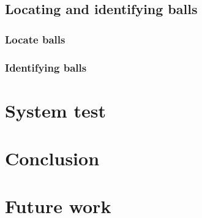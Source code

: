 
	\section{Locating and identifying balls}
		\label{sec:balls-intro}	
			
		
			\subsection{Locate balls}
				\label{sec:balls-locate}
				
		
			\subsection{Identifying balls}
				\label{sec:balls-id}
				

\chapter{System test}
	\label{sec:system-test}
	
	
\chapter{Conclusion}
	\label{sec:conclusion}
	
	
\chapter{Future work}
	\label{sec:futurework}
	




